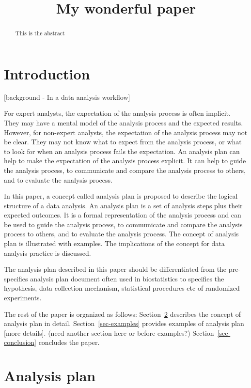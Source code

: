 \documentclass[
]{jds}
\title{My wonderful paper}
\author{}
\date{}
\begin{document}
\maketitle
\begin{abstract}
This is the abstract
\end{abstract}


\section{Introduction}\label{introduction}

{[}background - In a data analysis workflow{]}

For expert analysts, the expectation of the analysis process is often
implicit. They may have a mental model of the analysis process and the
expected results. However, for non-expert analysts, the expectation of
the analysis process may not be clear. They may not know what to expect
from the analysis process, or what to look for when an analysis process
fails the expectation. An analysis plan can help to make the expectation
of the analysis process explicit. It can help to guide the analysis
process, to communicate and compare the analysis process to others, and
to evaluate the analysis process.

In this paper, a concept called analysis plan is proposed to describe
the logical structure of a data analysis. An analysis plan is a set of
analysis steps plus their expected outcomes. It is a formal
representation of the analysis process and can be used to guide the
analysis process, to communicate and compare the analysis process to
others, and to evaluate the analysis process. The concept of analysis
plan is illustrated with examples. The implications of the concept for
data analysis practice is discussed.

The analysis plan described in this paper should be differentiated from
the pre-specifies analysis plan document often used in biostatistics to
specifies the hypothesis, data collection mechanism, statistical
procedures etc of randomized experiments.

The rest of the paper is organized as follows: Section~\ref{sec-plan}
describes the concept of analysis plan in detail.
Section~\ref{sec-examples} provides examples of analysis plan {[}more
details{]}. (need another section here or before examples?)
Section~\ref{sec-conclusion} concludes the paper.

\section{Analysis plan}\label{sec-plan}
\end{document}
